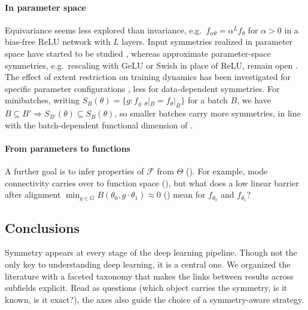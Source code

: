 \documentclass[mathematics,review,submit,moreauthors]{Definitions/mdpi}
\begin{document}
\paragraph{In parameter space}
Equivariance seems less explored than invariance, e.g.\ $f_{\alpha\theta}=\alpha^L f_\theta$ for $\alpha>0$ in a bias-free ReLU network with $L$ layers.
Input symmetries realized in parameter space have started to be studied \citep{galley2026}, whereas approximate parameter-space symmetries, e.g.\ rescaling with GeLU or Swish in place of ReLU, remain open \citep{ziyin2025a}.
The effect of extent restriction on training dynamics has been investigated for specific parameter configurations \citep{ziyin2025}, less for data-dependent symmetries.
For minibatches, writing $S_B(\theta)=\{g: f_{g\cdot\theta}|_B=f_\theta|_B\}$ for a batch $B$, we have $B\subseteq B'\Rightarrow S_{B'}(\theta)\subseteq S_B(\theta)$, so smaller batches carry more symmetries, in line with the batch-dependent functional dimension of \citet{elisendagrigsby2025aim}.

\paragraph{From parameters to functions}
A further goal is to infer properties of $\mathcal{F}$ from $\Theta$ ().
For example, mode connectivity carries over to function space (), but what does a low linear barrier after alignment $\min_{g\in G}B(\theta_0,g\cdot\theta_1)\approx 0$ () mean for $f_{\theta_0}$ and $f_{\theta_1}$?

\subsection{Conclusions}

Symmetry appears at every stage of the deep learning pipeline.
Though not the only key to understanding deep learning, it is a central one.
We organized the literature with a faceted taxonomy that makes the links between results across subfields explicit.
Read as questions (which object carries the symmetry, is it known, is it exact?), the axes also guide the choice of a symmetry-aware strategy.

\authorcontributions{}

\funding{}

\acknowledgments{}

\end{document}
